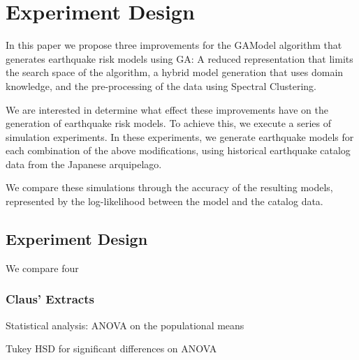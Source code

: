 

\section{Experiment Design}
\label{sec:experiment}

In this paper we propose three improvements for the GAModel algorithm
that generates earthquake risk models using GA: A reduced
representation that limits the search space of the algorithm, a hybrid
model generation that uses domain knowledge, and the pre-processing of
the data using Spectral Clustering.

We are interested in determine what effect these improvements have on
the generation of earthquake risk models. To achieve this, we execute
a series of simulation experiments. In these experiments, we generate
earthquake models for each combination of the above modifications,
using historical earthquake catalog data from the Japanese
arquipelago.

We compare these simulations through the accuracy of the resulting
models, represented by the log-likelihood between the model and the
catalog data.

\subsection{Experiment Design}


We compare four 





\subsubsection*{Claus' Extracts}

Statistical analysis: ANOVA on the populational means

Tukey HSD for significant differences on ANOVA

